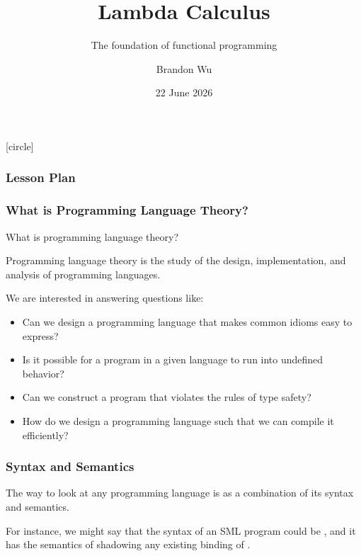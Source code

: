 \documentclass[aspectratio=169, handout]{beamer}
\title{Lambda Calculus} %
\subtitle{The foundation of functional programming} %
\date{22 June 2026} %
\author{Brandon Wu} %
\newif\ifcolorlambda
\begin{document}
\ifweb
\renewcommand{\pause}{}
\fi

[circle]

{
\begin{frame}[plain]
\colorlambdatrue
\titlepage
\end{frame}
}

\begin{frame}[fragile]
\frametitle{Lesson Plan}

\tableofcontents
\end{frame}



\begin{frame}[fragile]
\frametitle{What is Programming Language Theory?}

What is programming language theory?

\pause
\vspace{\fill}

Programming language theory is the study of the design, implementation,
and analysis of programming languages.

\pause
\vspace{\fill}

We are interested in answering questions like:
\begin{itemize}
  \item Can we design a programming language that makes common
  idioms easy to express?
  \item Is it possible for a program in a given language to
  run into undefined behavior?
  \item Can we construct a program that violates the rules of
  type safety?
  \item How do we design a programming language such that we can
  compile it efficiently?
\end{itemize}
\end{frame}

\begin{frame}[fragile]
  \frametitle{Syntax and Semantics}

  The way to look at any programming language is as a combination of
  its syntax and semantics.

  \pause
  \vspace{\fill}


  \pause
  \vspace{\fill}


  \pause
  \vspace{\fill}

  For instance, we might say that the syntax of an SML program could
  be , and it has the semantics of shadowing any
  existing binding of .
\end{frame}
\end{document}
